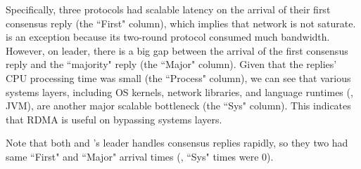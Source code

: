 Specifically, three protocols had scalable latency on the arrival of their 
first consensus reply (the ``First" column), which implies that network is not 
saturate. \libpaxos is an exception because its two-round protocol consumed 
much bandwidth. However, on leader, there is a big gap between the arrival of 
the first consensus reply and the ``majority" reply (the ``Major" column). 
Given that the replies' CPU processing time was small (the ``Process" column), 
we can see that various systems layers, including OS kernels, network 
libraries, and language runtimes (\eg, JVM), are another major scalable 
bottleneck (the ``Sys" column). This indicates that RDMA is useful on bypassing 
systems layers.

Note that both \crane and \spaxos's leader handles consensus replies 
rapidly, so they two had same ``First" and ``Major" arrival times (\ie, 
``Sys" times were 0).


% 



